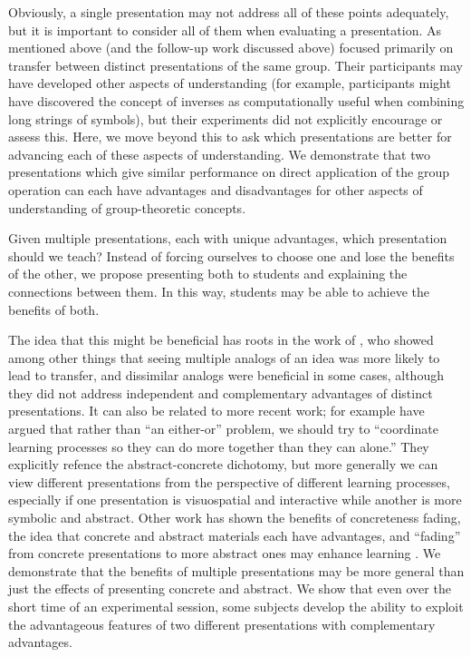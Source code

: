 \documentclass[man,10pt]{apa6}
\begin{document}
Obviously, a single presentation may not address all of these points adequately, but it is important to consider all of them when evaluating a presentation. As mentioned above  (and the follow-up work discussed above) focused primarily on transfer between distinct presentations of the same group. Their participants may have developed other aspects of understanding (for example, participants might have discovered the concept of inverses as computationally useful when combining long strings of symbols), but their experiments did not explicitly encourage or assess this. Here, we move beyond this to ask which presentations are better for advancing each of these aspects of understanding. We demonstrate that two presentations which give similar performance on direct application of the group operation can each have advantages and disadvantages for other aspects of understanding of group-theoretic concepts.\par
Given multiple presentations, each with unique advantages, which presentation should we teach? Instead of forcing ourselves to choose one and lose the benefits of the other, we propose presenting both to students and explaining the connections between them. In this way, students may be able to achieve the benefits of both.\par
The idea that this might be beneficial has roots in the work of , who showed among other things that seeing multiple analogs of an idea was more likely to lead to transfer, and dissimilar analogs were beneficial in some cases, although they did not address independent and complementary advantages of distinct presentations. It can also be related to more recent work; for example  have argued that rather than ``an either-or'' problem, we should try to ``coordinate learning processes so they can do more together than they can alone.'' They explicitly refence the abstract-concrete dichotomy, but more generally we can view different presentations from the perspective of different learning processes, especially if one presentation is visuospatial and interactive while another is more symbolic and abstract. Other work has shown the benefits of concreteness fading, the idea that concrete and abstract materials each have advantages, and ``fading'' from concrete presentations to more abstract ones may enhance learning \cite{Fyfe2014}. We demonstrate that the benefits of multiple presentations may be more general than just the effects of presenting concrete and abstract. We show that even over the short time of an experimental session, some subjects develop the ability to exploit the advantageous features of two different presentations with complementary advantages.  \par
\end{document}
